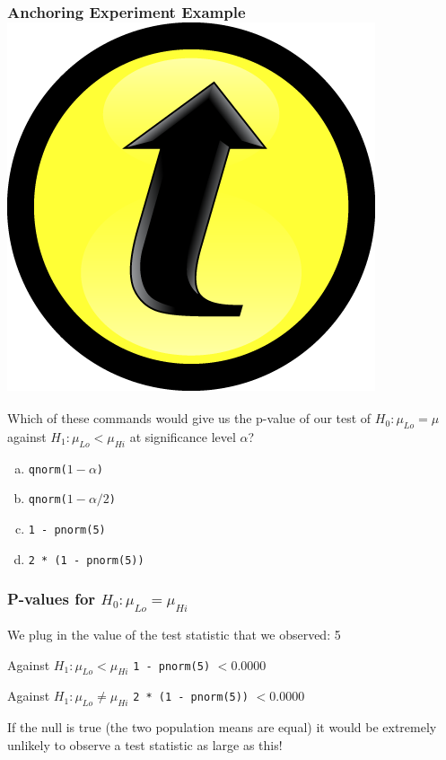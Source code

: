 \documentclass[handout]{beamer}
\begin{document}
\begin{frame}
\frametitle{Anchoring Experiment Example\hfill \includegraphics[scale = 0.05]{./images/clicker}}
Which of these commands would give us the p-value of our test of $H_0\colon \mu_{Lo} = \mu$ against $H_1\colon \mu_{Lo}<\mu_{Hi}$ at significance level $\alpha$?
\vspace{1em}
	\begin{enumerate}[(a)]
		\item \texttt{qnorm($1-\alpha$)}
		\item \texttt{qnorm($1-\alpha/2$)}
		\item \texttt{1 - pnorm(5)}
		\item \texttt{2 * (1 - pnorm(5))}
	\end{enumerate}
	

\end{frame}

\begin{frame}
\frametitle{P-values for $H_0\colon \mu_{Lo} = \mu_{Hi}$}
We plug in the value of the test statistic that we observed: 5
\begin{block}{Against $H_1\colon \mu_{Lo}< \mu_{Hi}$}
\texttt{1 - pnorm(5)} $< 0.0000$
\end{block}

\begin{block}{Against $H_1\colon \mu_{Lo}\neq \mu_{Hi}$}
\texttt{2 * (1 - pnorm(5))} $< 0.0000$
\end{block}

\vspace{1em}

\alert{If the null is true (the two population means are equal) it would be extremely unlikely to observe a test statistic as large as this!}

\vspace{1em} 
\hfill {}
\end{frame}
\end{document}
